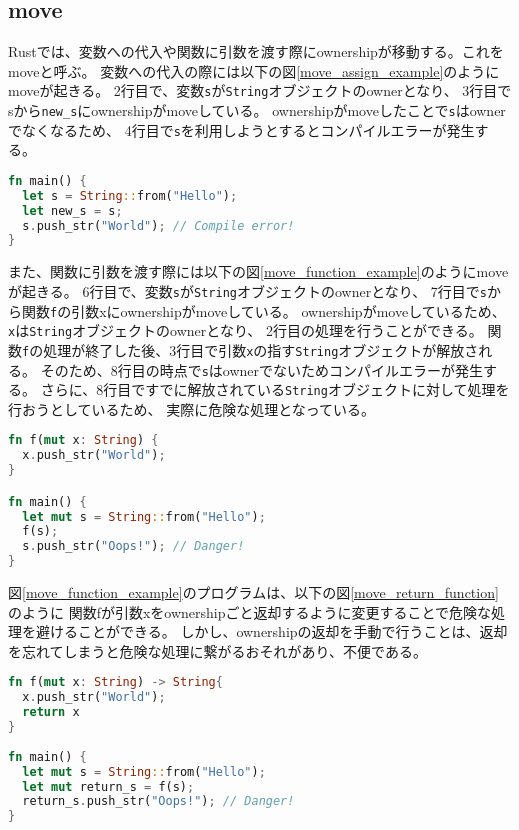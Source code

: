 \documentclass{sumiilab-paper}
\theoremstyle{mystyle}
\numberwithin{definition}{chapter} %
\begin{document}
\subsection{move}
Rustでは、変数への代入や関数に引数を渡す際にownershipが移動する。これをmoveと呼ぶ。
変数への代入の際には以下の図\ref{move_assign_example}のようにmoveが起きる。
2行目で、変数\texttt{s}が\texttt{String}オブジェクトのownerとなり、
3行目でsから\texttt{new\_s}にownershipがmoveしている。
ownershipがmoveしたことで\texttt{s}はownerでなくなるため、
4行目で\texttt{s}を利用しようとするとコンパイルエラーが発生する。
\begin{lstlisting}[language=Rust, caption=変数への代入でmoveが起こる例,
  label=move_assign_example, captionpos=b]
fn main() {
  let s = String::from("Hello");
  let new_s = s;
  s.push_str("World"); // Compile error!
}    
\end{lstlisting}
また、関数に引数を渡す際には以下の図\ref{move_function_example}のようにmoveが起きる。
6行目で、変数\texttt{s}が\texttt{String}オブジェクトのownerとなり、
7行目で\texttt{s}から関数\texttt{f}の引数xにownershipがmoveしている。
ownershipがmoveしているため、\texttt{x}は\texttt{String}オブジェクトのownerとなり、
2行目の処理を行うことができる。
関数\texttt{f}の処理が終了した後、3行目で引数\texttt{x}の指す\texttt{String}オブジェクトが解放される。
そのため、8行目の時点で\texttt{s}はownerでないためコンパイルエラーが発生する。
さらに、8行目ですでに解放されている\texttt{String}オブジェクトに対して処理を行おうとしているため、
実際に危険な処理となっている。
\begin{lstlisting}[language=Rust, caption=関数に引数を渡す際にmoveが起こる例, 
label=move_function_example, captionpos=b]
fn f(mut x: String) {
  x.push_str("World");
}

fn main() {
  let mut s = String::from("Hello");
  f(s);
  s.push_str("Oops!"); // Danger!
}
\end{lstlisting}
図\ref{move_function_example}のプログラムは、以下の図\ref{move_return_function}のように
関数fが引数xをownershipごと返却するように変更することで危険な処理を避けることができる。
しかし、ownershipの返却を手動で行うことは、返却を忘れてしまうと危険な処理に繋がるおそれがあり、不便である。
\begin{lstlisting}[language=Rust, caption=危険な処理を避けた例, 
  label=move_return_function, captionpos=b]
fn f(mut x: String) -> String{
  x.push_str("World");
  return x
}
  
fn main() {
  let mut s = String::from("Hello");
  let mut return_s = f(s);
  return_s.push_str("Oops!"); // Danger!
}
\end{lstlisting}
\end{document}

